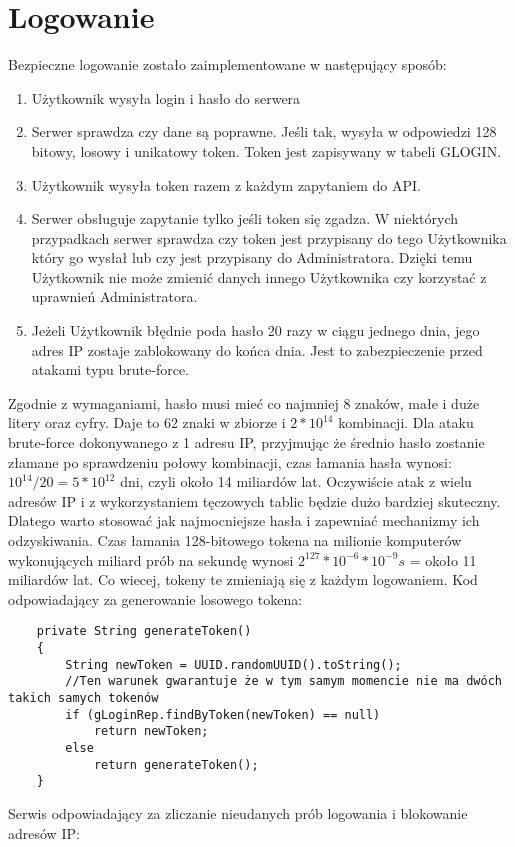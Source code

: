 \documentclass[a4paper,12pt,twoside,openany]{report}
\begin{document}
\section{Logowanie}
Bezpieczne logowanie zostało zaimplementowane w następujący sposób:
\begin{enumerate}
	\item Użytkownik wysyła login i hasło do serwera
	\item Serwer sprawdza czy dane są poprawne. Jeśli tak, wysyła w odpowiedzi 128 bitowy, losowy i unikatowy token. Token jest zapisywany w tabeli GLOGIN.
	\item Użytkownik wysyła token razem z każdym zapytaniem do API.
	\item Serwer obsługuje zapytanie tylko jeśli token się zgadza. W niektórych przypadkach serwer sprawdza czy token jest przypisany do tego Użytkownika który go wysłał lub czy jest przypisany do Administratora. Dzięki temu Użytkownik nie może zmienić danych innego Użytkownika czy korzystać z uprawnień Administratora.
	\item Jeżeli Użytkownik błędnie poda hasło 20 razy w ciągu jednego dnia, jego adres IP zostaje zablokowany do końca dnia. Jest to zabezpieczenie przed atakami typu brute-force.
\end{enumerate}
Zgodnie z wymaganiami, hasło musi mieć co najmniej 8 znaków, małe i duże litery oraz cyfry. Daje to 62 znaki w zbiorze i $2*10^{14}$ kombinacji. Dla ataku brute-force dokonywanego z 1 adresu IP, przyjmując że średnio hasło zostanie złamane po sprawdzeniu połowy kombinacji, czas łamania hasła wynosi:  $10^{14}/20=5*10^{12}$ dni, czyli około 14 miliardów lat. Oczywiście atak z wielu adresów IP i z wykorzystaniem tęczowych tablic będzie dużo bardziej skuteczny. Dlatego warto stosować jak najmocniejsze hasła i zapewniać mechanizmy ich odzyskiwania. Czas łamania 128-bitowego tokena na milionie komputerów wykonujących miliard prób na sekundę wynosi $2^{127}*10^{-6}*10^{-9}s$ = około 11 miliardów lat. Co wiecej, tokeny te zmieniają się z każdym logowaniem.
Kod odpowiadający za generowanie losowego tokena:
\begin{lstlisting}
    private String generateToken()
    {
        String newToken = UUID.randomUUID().toString();
        //Ten warunek gwarantuje że w tym samym momencie nie ma dwóch takich samych tokenów
        if (gLoginRep.findByToken(newToken) == null)
            return newToken;
        else
            return generateToken();
    }
\end{lstlisting}
Serwis odpowiadający za zliczanie nieudanych prób logowania i blokowanie adresów IP:
\end{document}

